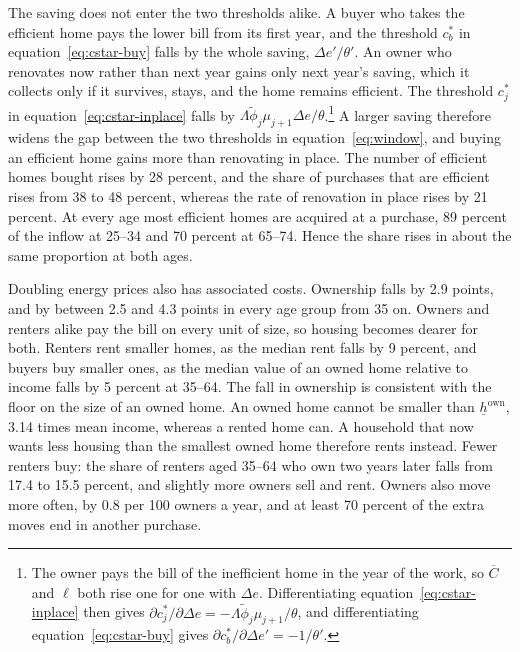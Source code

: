 The saving does not enter the two thresholds alike. A buyer who takes the
efficient home pays the lower bill from its first year, and the threshold
$c_b^*$ in equation~\eqref{eq:cstar-buy} falls by the whole saving,
$\Delta e'/\theta'$. An owner who renovates now rather than next year gains
only next year's saving, which it collects only if it survives, stays, and
the home remains efficient. The threshold $c_j^*$ in
equation~\eqref{eq:cstar-inplace} falls by
$\Lambda\tilde\phi_j\mu_{j+1}\Delta e/\theta$.\footnote{The owner pays the
bill of the inefficient home in the year of the work, so $\overline C$ and
$\ell$ both rise one for one with $\Delta e$. Differentiating
equation~\eqref{eq:cstar-inplace} then gives $\partial c_j^*/\partial\Delta
e=-\Lambda\tilde\phi_j\mu_{j+1}/\theta$, and differentiating
equation~\eqref{eq:cstar-buy} gives $\partial c_b^*/\partial\Delta
e'=-1/\theta'$.} A larger saving therefore widens the gap between the two
thresholds in equation~\eqref{eq:window}, and buying an efficient home gains
more than renovating in place. The number of efficient homes bought rises by
28 percent, and the share of purchases that are efficient rises from 38 to
48 percent, whereas the rate of renovation in place rises by 21 percent. At
every age most efficient homes are acquired at a purchase, 89 percent of
the inflow at 25--34 and 70 percent at 65--74. Hence the share rises in
about the same proportion at both ages.

Doubling energy prices also has associated costs. Ownership falls by 2.9
points, and by between 2.5 and 4.3 points in every age group from 35 on.
Owners and renters alike pay the bill on every unit of size, so housing
becomes dearer for both. Renters rent smaller homes, as the median rent
falls by 9 percent, and buyers buy smaller ones, as the median value of an
owned home relative to income falls by 5 percent at 35--64. The fall in
ownership is consistent with the floor on the size of an owned home. An
owned home cannot be smaller than $\underline h^{\mathrm{own}}$, 3.14 times
mean income, whereas a rented home can. A household that now wants less
housing than the smallest owned home therefore rents instead. Fewer renters
buy: the share of renters aged 35--64 who own two years later falls from
17.4 to 15.5 percent, and slightly more owners sell and rent. Owners also
move more often, by 0.8 per 100 owners a year, and at least 70 percent of
the extra moves end in another purchase.

